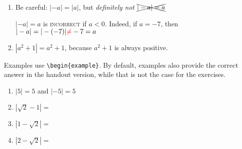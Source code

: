 \documentclass{ximera}
\begin{document}
\begin{remark}
    \begin{enumerate}
        \item Be careful: $|-a|= |a|$, but \textit{definitely
                  not} $\xcancel{|-a|=a}$

              $|-a|=a$ is \textsc{incorrect} if $a<0$. Indeed, if
              $a=-7$, then $|-a| = |-(-7)| {\color{red}\neq} -7 = a$
        \item $|a^2 + 1| = a^2 + 1$, because $a^2+1$ is always
              positive.
    \end{enumerate}
\end{remark}

Examples use \verb|\begin{example}|.
By default, examples also provide the correct answer in the handout version,
while that is not the case for the exercises.


\begin{example}

    \begin{enumerate}
        \item $|5|=5$ and $|-5|=5$
        \item $|\sqrt{2}-1| =
              $
        \item $|1-\sqrt{2}| =
              $
        \item $|2-\sqrt{2}| = $
    \end{enumerate}
\end{example}
\end{document}
